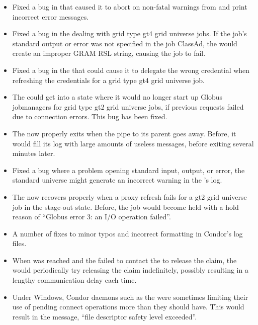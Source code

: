 \begin{itemize}
\item Fixed a bug in  that caused it to abort on non-fatal
warnings from  and print incorrect error messages.

\item Fixed a bug in the  dealing with grid type gt4
grid universe jobs. If the job's standard output or error was not specified
in the job ClassAd, the  would create an improper GRAM
RSL string, causing the job to fail.

\item Fixed a bug in the  that could cause it to
delegate the wrong credential when refreshing the credentials for a
grid type gt4 grid universe job.

\item The  could get into a state where it would no
longer start up Globus jobmanagers for grid type gt2 grid universe jobs,
if previous requests failed due to connection errors. This bug has been
fixed.

\item The  now properly exits when the pipe to its parent
goes away. Before, it would fill its log with large amounts of useless
messages, before exiting several minutes later.

\item Fixed a bug where a problem opening standard input, output, or error,
the standard universe might generate an incorrect warning in the 
's log.

\item The  now recovers properly when a proxy refresh
fails for a gt2 grid universe job in the stage-out state. Before, the job
would become held with a hold reason of ``Globus error 3: an I/O operation
failed''.

\item A number of fixes to minor typos and incorrect formatting in
Condor's log files.

\item When  was reached and the
failed to contact the  to release the claim, the 
 would
periodically try releasing the claim indefinitely, possibly resulting in
a lengthy communication delay each time.

\item Under Windows, Condor daemons such as the  were sometimes
limiting their use of pending connect operations more than they should
have.  This would result in the message, ``file descriptor safety level
exceeded''.


\end{itemize}

